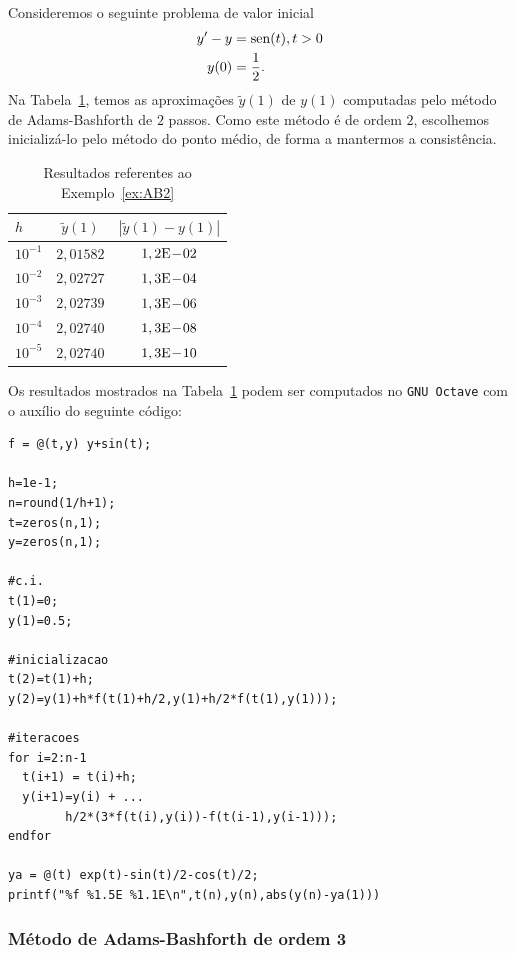 \begin{ex}\label{ex:AB2}
  Consideremos o seguinte problema de valor inicial
  \begin{align}
    y' - y &= \operatorname{sen}(t), t>0\\
    y(0) &= \frac{1}{2}.
  \end{align}
  Na Tabela~\ref{tab:ex_AB2}, temos as aproximações $\tilde{y}(1)$ de $y(1)$ computadas pelo método de Adams-Bashforth de $2$ passos. Como este método é de ordem $2$, escolhemos inicializá-lo pelo método do ponto médio, de forma a mantermos a consistência.
 
  \begin{table}[h!]
    \centering
    \begin{tabular}{l|cc}
      $h$ & $\tilde{y}(1)$ & $|\tilde{y}(1)-y(1)|$\\\hline
      $10^{-1}$ & $2,01582$ & $1,2\mathrm{E}\!-\!02$ \\
      $10^{-2}$ & $2,02727$ & $1,3\mathrm{E}\!-\!04$ \\
      $10^{-3}$ & $2,02739$ & $1,3\mathrm{E}\!-\!06$ \\
      $10^{-4}$ & $2,02740$ & $1,3\mathrm{E}\!-\!08$ \\
      $10^{-5}$ & $2,02740$ & $1,3\mathrm{E}\!-\!10$ \\\hline
    \end{tabular}
    \caption{Resultados referentes ao Exemplo~\ref{ex:AB2}}
    \label{tab:ex_AB2}
  \end{table}

\ifisoctave
Os resultados mostrados na Tabela~\ref{tab:ex_AB2} podem ser computados no \verb+GNU Octave+ com o auxílio do seguinte código:
\begin{verbatim}
f = @(t,y) y+sin(t);

h=1e-1;
n=round(1/h+1);
t=zeros(n,1);
y=zeros(n,1);

#c.i.
t(1)=0;
y(1)=0.5;

#inicializacao
t(2)=t(1)+h;
y(2)=y(1)+h*f(t(1)+h/2,y(1)+h/2*f(t(1),y(1)));

#iteracoes
for i=2:n-1
  t(i+1) = t(i)+h;
  y(i+1)=y(i) + ...
        h/2*(3*f(t(i),y(i))-f(t(i-1),y(i-1)));
endfor

ya = @(t) exp(t)-sin(t)/2-cos(t)/2;
printf("%f %1.5E %1.1E\n",t(n),y(n),abs(y(n)-ya(1)))
\end{verbatim}
\fi
\end{ex}

\subsubsection{Método de Adams-Bashforth de ordem 3}

